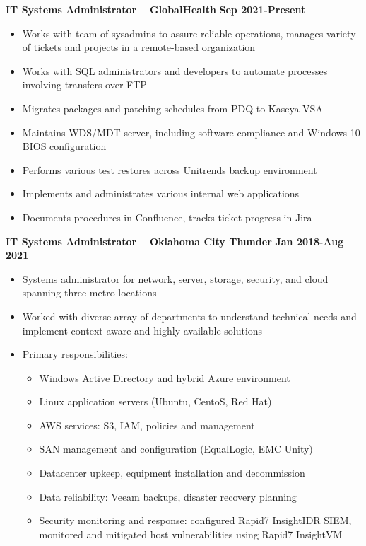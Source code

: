 \documentclass[line]{res}
\begin{document}
\begin{resume}
\textbf{IT Systems Administrator -- GlobalHealth}
\newline
\textbf{Sep 2021-Present}
\begin{itemize}
	\item Works with team of sysadmins to assure reliable operations, manages variety of tickets and projects in a remote-based organization
	\item Works with SQL administrators and developers to automate processes involving transfers over FTP
	\item Migrates packages and patching schedules from PDQ to Kaseya VSA
	\item Maintains WDS/MDT server, including software compliance and Windows 10 BIOS configuration
	\item Performs various test restores across Unitrends backup environment
	\item Implements and administrates various internal web applications
	\item Documents procedures in Confluence, tracks ticket progress in Jira 
\end{itemize}
\textbf{IT Systems Administrator -- Oklahoma City Thunder}
\newline
\textbf{Jan 2018-Aug 2021}
\begin{itemize}
	\item Systems administrator for network, server, storage, security, and cloud spanning three metro locations
	\item Worked with diverse array of departments to understand technical needs and implement context-aware and highly-available solutions
	\item Primary responsibilities:
		\begin{itemize}
			\item Windows Active Directory and hybrid Azure environment
			\item Linux application servers (Ubuntu, CentoS, Red Hat)
			\item AWS services: S3, IAM, policies and management
			\item SAN management and configuration (EqualLogic, EMC Unity)
			\item Datacenter upkeep, equipment installation and decommission
			\item Data reliability: Veeam backups, disaster recovery planning
			\item Security monitoring and response: configured Rapid7 InsightIDR SIEM, monitored and mitigated host vulnerabilities using Rapid7 InsightVM

\end{itemize}
\end{itemize}
\end{resume}
\end{document}
